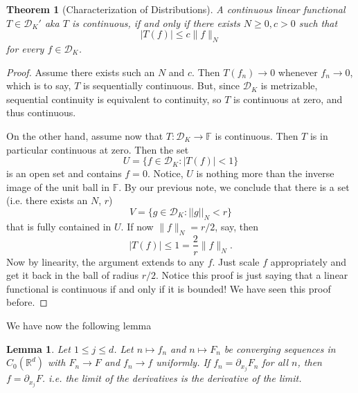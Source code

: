 \documentclass[letterpaper,twoside,11pt]{article}
\theoremstyle{mystyle}
\newtheorem{theorem}{Theorem}[section]
\newtheorem*{lemm}{Lemma}
\newcommand{\R}{{\mathbb R}}
\newcommand{\cg}{\color{gray}}
\newcommand{\cbk}{\color{black}}
\begin{document}
\begin{tcolorbox}[colback=red!5!white,colframe=red!75!black]
\begin{theorem}[Characterization of Distributions]
  A continuous linear functional $T \in \mathcal D_K'$ \cg aka $T$ is continuous, \cbk  if and only if there exists $N\geq 0, c>0$ such that 
  \[|T(f)|\leq c \|f\|_N\]
  for every $f \in \mathcal D_K$. 
\end{theorem}
\end{tcolorbox}
\begin{proof}
  Assume there exists such an $N$ and $c$. Then $T(f_n) \to 0$ whenever $f_n \to 0$, which is to say, $T$ is sequentially continuous. But, since $\mathcal D_K$ is metrizable, sequential continuity is equivalent to continuity, so $T$ is continuous at zero, and thus continuous.
  
  On the other hand, assume now that $T:\mathcal D_K \to \mathbb F$ is continuous. Then $T$ is in particular continuous at zero. Then the set 
  \[U = \{f \in \mathcal D_K : |T(f)|<1 \}\] is an open set and contains $f = 0$. \cg Notice, $U$ is nothing more than the inverse image of the unit ball in $\mathbb F$. \cbk  By our previous note, we conclude that there is a set (i.e. there exists an $N$, $r$) 
  \[V = \{g \in \mathcal D_K : ||g||_N<r\}\]
  that is fully contained in $U$. If now $\|f\|_N = r/2$, say, then 
  \[|T(f)| \leq  1 = \frac{2}{r}\|f\|_N.\]
  Now by linearity, the argument extends to any $f$. Just scale $f$ appropriately and get it back in the ball of radius $r/2$. 
  \cg Notice this proof is just saying that a linear functional is continuous if and only if it is bounded! We have seen this proof before. \cbk 
\end{proof}
We have now the following lemma 
\begin{lemm}
  Let $1 \leq j \leq d$. Let $n\mapsto f_n$ and $n\mapsto F_n$ be converging sequences in $C_0(\R^d)$ with $F_n \to F$ and $f_n \to f$ uniformly. If $f_n = \partial_{x_j} F_n$ for all $n$, then $f = \partial_{x_j} F$. \cg i.e. the limit of the derivatives is the derivative of the limit. \cbk 
\end{lemm}
\end{document}
